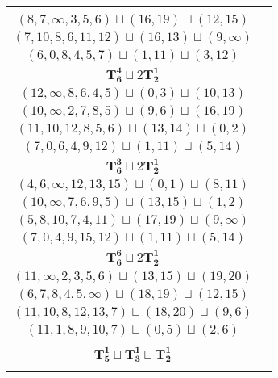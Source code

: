 \documentclass{article}
\begin{document}
\begin{longtable}{|c|c|}
\begin{tabular}{c}
        $(5,\infty,6,4,8,11)\sqcup(10,13)\sqcup(19,20)$ \\ 
        $(8,7,\infty,3,5,6)\sqcup(16,19)\sqcup(12,15)$ \\ 
        $(7,10,8,6,11,12)\sqcup(16,13)\sqcup(9,\infty)$ \\ 
        $(6,0,8,4,5,7)\sqcup(1,11)\sqcup(3,12)$
        \end{tabular} \\ 
        \hline
        $\mathbf{T_{6}^{4}} \sqcup 2\mathbf{T_{2}^{1}}$ & \begin{tabular}{c}
        $(5,4,7,2,1,3)\sqcup(8,11)\sqcup(18,\infty)$ \\ 
        $(12,\infty,8,6,4,5)\sqcup(0,3)\sqcup(10,13)$ \\ 
        $(10,\infty,2,7,8,5)\sqcup(9,6)\sqcup(16,19)$ \\ 
        $(11,10,12,8,5,6)\sqcup(13,14)\sqcup(0,2)$ \\ 
        $(7,0,6,4,9,12)\sqcup(1,11)\sqcup(5,14)$
        \end{tabular} \\ 
        \hline
        $\mathbf{T_{6}^{3}} \sqcup 2\mathbf{T_{2}^{1}}$ & \begin{tabular}{c}
        $(5,4,2,3,6,0)\sqcup(9,12)\sqcup(11,\infty)$ \\ 
        $(4,6,\infty,12,13,15)\sqcup(0,1)\sqcup(8,11)$ \\ 
        $(10,\infty,7,6,9,5)\sqcup(13,15)\sqcup(1,2)$ \\ 
        $(5,8,10,7,4,11)\sqcup(17,19)\sqcup(9,\infty)$ \\ 
        $(7,0,4,9,15,12)\sqcup(1,11)\sqcup(5,14)$
        \end{tabular} \\ 
        \hline
        $\mathbf{T_{6}^{6}} \sqcup 2\mathbf{T_{2}^{1}}$ & \begin{tabular}{c}
        $(1,2,0,3,4,5)\sqcup(\infty,15)\sqcup(8,11)$ \\ 
        $(11,\infty,2,3,5,6)\sqcup(13,15)\sqcup(19,20)$ \\ 
        $(6,7,8,4,5,\infty)\sqcup(18,19)\sqcup(12,15)$ \\ 
        $(11,10,8,12,13,7)\sqcup(18,20)\sqcup(9,6)$ \\ 
        $(11,1,8,9,10,7)\sqcup(0,5)\sqcup(2,6)$
        \end{tabular} \\ 
        \hline
        $\mathbf{T_{5}^{1}} \sqcup \mathbf{T_{3}^{1}} \sqcup \mathbf{T_{2}^{1}}$ & \begin{tabular}{c}

\end{tabular}
\end{longtable}
\end{document}

